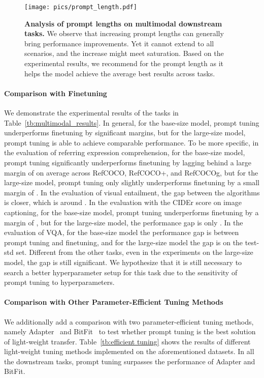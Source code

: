\documentclass[11pt]{article}
\begin{document}
\begin{figure*}[t]
    \centering
    \texttt{[image: pics/prompt\_length.pdf]}
    \caption{\textbf{Analysis of prompt lengths on multimodal downstream tasks. } We observe that increasing prompt lengths can generally bring performance improvements. Yet it cannot extend to all scenarios, and the increase might meet saturation. Based on the experimental results, we recommend  for the prompt length as it helps the model achieve the average best results across tasks. }
    \label{fig:prompt_length}
\end{figure*}


\paragraph{Comparison with Finetuning} 
We demonstrate the experimental results of the  tasks in Table~\ref{tb:multimodal_results}. 
In general, for the base-size model, prompt tuning underperforms finetuning by significant margins, but for the large-size model, prompt tuning is able to achieve comparable performance. 
To be more specific, in the evaluation of referring expression comprehension, for the base-size model, prompt tuning significantly underperforms finetuning by lagging behind a large margin of  on average across RefCOCO, RefCOCO+, and RefCOCOg, but for the large-size model, prompt tuning only slightly underperforms finetuning by a small margin of . 
In the evaluation of visual entailment, the gap between the algorithms is closer, which is around . 
In the evaluation with the CIDEr score on image captioning, for the base-size model, prompt tuning underperforms finetuning by a margin of , but for the large-size model, the performance gap is only . 
In the evaluation of VQA, for the base-size model the performance gap is  between prompt tuning and finetuning, and for the large-size model the gap is  on the test-std set. Different from the other tasks, even in the experiments on the large-size model, the gap is still significant. 
We hypothesize that it is still necessary to search a better hyperparameter setup for this task due to the sensitivity of prompt tuning to hyperparameters. 


\paragraph{Comparison with Other Parameter-Efficient Tuning Methods} 
We additionally add a comparison with two parameter-efficient tuning methods, namely Adapter~\citep{adapter} and BitFit~\citep{bitfit} to test whether prompt tuning is the best solution of light-weight transfer. 
Table~\ref{tb:efficient tuning} shows the results of different light-weight tuning methods implemented on the aforementioned datasets. 
In all the downstream tasks, prompt tuning surpasses the performance of Adapter and BitFit. 
\end{document}
